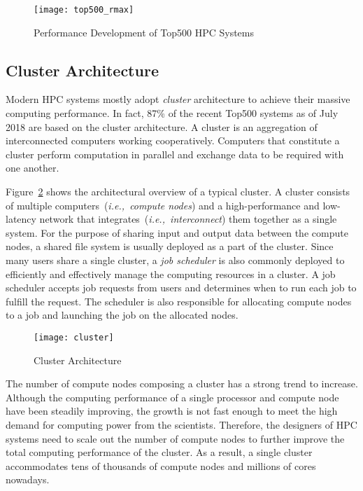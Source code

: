 \begin{figure}
    \centering
    \texttt{[image: top500\_rmax]}
    \caption{Performance Development of Top500 HPC Systems~\autocite{top500}}%
    \label{fig:top500-rmax}
\end{figure}

\subsection{Cluster Architecture}

Modern HPC systems mostly adopt \emph{cluster} architecture to achieve their
massive computing performance. In fact, 87\% of the recent Top500 systems
as of July 2018 are based on the cluster architecture. A cluster is an
aggregation of interconnected computers working cooperatively. Computers that
constitute a cluster perform computation in parallel and exchange data to be
required with one another.

Figure~\ref{fig:cluster} shows the architectural overview of a typical
cluster. A cluster consists of multiple computers~(\emph{i.e.,\ compute
nodes}) and a high-performance and low-latency network that
integrates~(\emph{i.e.,\ interconnect}) them together as a single system.
For the purpose of sharing input and output data between the compute nodes, a
shared file system is usually deployed as a part of the cluster. Since many
users share a single cluster, a \emph{job scheduler} is also commonly deployed to
efficiently and effectively manage the computing resources in a cluster. A job
scheduler accepts job requests from users and determines when to run each job
to fulfill the request. The scheduler is also responsible for allocating
compute nodes to a job and launching the job on the allocated nodes.

\begin{figure}
    \centering
    \texttt{[image: cluster]}
    \caption{Cluster Architecture}%
    \label{fig:cluster}
\end{figure}

The number of compute nodes composing a cluster has a strong trend to
increase. Although the computing performance of a single processor and compute
node have been steadily improving, the growth is not fast enough to meet the
high demand for computing power from the scientists. Therefore, the designers
of HPC systems need to scale out the number of compute nodes to further
improve the total computing performance of the cluster. As a result, a single
cluster accommodates tens of thousands of compute nodes and millions of cores
nowadays.


